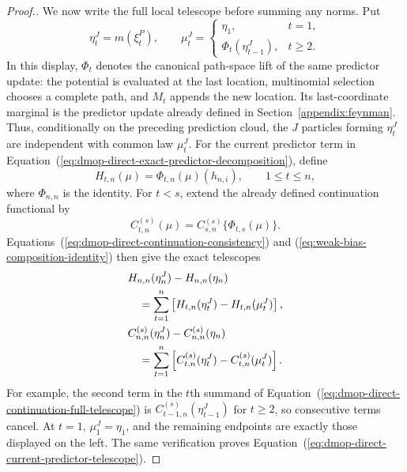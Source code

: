 \documentclass[11pt]{article}
\theoremstyle{thmstylethree}%
\begin{document}
\begin{proof}[Proof.]
We now write the full local telescope before summing any norms.  Put
\begin{equation}
\eta_t^J=m(\xi_t^P),
\qquad
\mu_t^J=
\begin{cases}
\eta_1,&t=1,\\
\Phi_t(\eta_{t-1}^J),&t\geq2.
\end{cases}
\label{eq:dmop-direct-local-predictor-law}
\end{equation}
In this display, $\Phi_t$ denotes the canonical path-space lift of the
same predictor update: the potential is evaluated at the last location,
multinomial selection chooses a complete path, and $M_t$ appends the new
location.  Its last-coordinate marginal is the predictor update already
defined in Section~\ref{appendix:feynman}.
Thus, conditionally on the preceding prediction cloud, the $J$ particles
forming $\eta_t^J$ are independent with common law $\mu_t^J$.  For the
current predictor term in
Equation~(\ref{eq:dmop-direct-exact-predictor-decomposition}), define
\begin{equation}
H_{t,n}(\mu)=\Phi_{t,n}(\mu)(h_{n,i}),
\qquad 1\leq t\leq n,
\label{eq:dmop-direct-current-predictor-continuation}
\end{equation}
where $\Phi_{n,n}$ is the identity.  For $t<s$, extend the already
defined continuation functional by
\begin{equation}
C_{t,n}^{(s)}(\mu)
=C_{s,n}^{(s)}\{\Phi_{t,s}(\mu)\}.
\label{eq:dmop-direct-backward-continuation-definition}
\end{equation}
Equations~(\ref{eq:dmop-direct-continuation-consistency}) and
(\ref{eq:weak-bias-composition-identity}) then give the exact telescopes
\begin{align}
&H_{n,n}(\eta_n^J)-H_{n,n}(\eta_n)                         \notag\\
&\quad=
\sum_{t=1}^{n}
\left[
H_{t,n}(\eta_t^J)-H_{t,n}(\mu_t^J)
\right],
\label{eq:dmop-direct-current-predictor-telescope}
\\
&C_{n,n}^{(s)}(\eta_n^J)-C_{n,n}^{(s)}(\eta_n)             \notag\\
&\quad=
\sum_{t=1}^{n}
\left[
C_{t,n}^{(s)}(\eta_t^J)-C_{t,n}^{(s)}(\mu_t^J)
\right].
\label{eq:dmop-direct-continuation-full-telescope}
\end{align}
For example, the second term in the $t$th summand of
Equation~(\ref{eq:dmop-direct-continuation-full-telescope}) is
$C_{t-1,n}^{(s)}(\eta_{t-1}^J)$ for $t\geq2$, so consecutive terms
cancel.  At $t=1$, $\mu_1^J=\eta_1$, and the remaining endpoints are
exactly those displayed on the left.  The same verification proves
Equation~(\ref{eq:dmop-direct-current-predictor-telescope}).


\end{proof}
\end{document}
